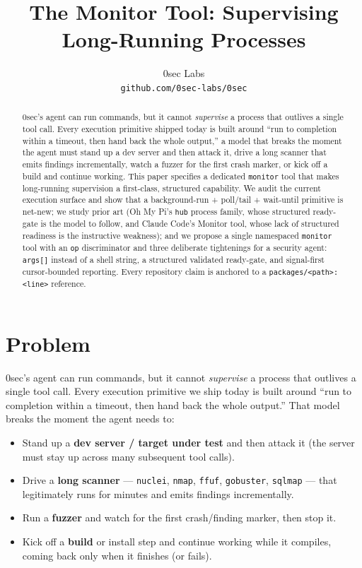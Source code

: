 \documentclass[11pt]{article}
\title{The Monitor Tool: Supervising Long-Running Processes}
\author{
  0sec Labs \\
  \texttt{github.com/0sec-labs/0sec}
}
\date{}
\begin{document}
\maketitle

\begin{abstract}
0sec's agent can run commands, but it cannot \textit{supervise} a process that
outlives a single tool call. Every execution primitive shipped today is built
around ``run to completion within a timeout, then hand back the whole output,'' a
model that breaks the moment the agent must stand up a dev server and then attack
it, drive a long scanner that emits findings incrementally, watch a fuzzer for
the first crash marker, or kick off a build and continue working. This paper
specifies a dedicated \texttt{monitor} tool that makes long-running supervision a
first-class, structured capability. We audit the current execution surface and
show that a background-run + poll/tail + wait-until primitive is net-new; we
study prior art (Oh My Pi's \texttt{hub} process family, whose structured
ready-gate is the model to follow, and Claude Code's Monitor tool, whose lack of
structured readiness is the instructive weakness); and we propose a single
namespaced \texttt{monitor} tool with an \texttt{op} discriminator and three
deliberate tightenings for a security agent: \texttt{args[]} instead of a shell
string, a structured validated ready-gate, and signal-first cursor-bounded
reporting. Every repository claim is anchored to a
\texttt{packages/<path>:<line>} reference.
\end{abstract}

\section{Problem}

0sec's agent can run commands, but it cannot \textit{supervise} a process that
outlives a single tool call. Every execution primitive we ship today is built
around ``run to completion within a timeout, then hand back the whole output.''
That model breaks the moment the agent needs to:

\begin{itemize}[leftmargin=*]
  \item Stand up a \textbf{dev server / target under test} and then attack it
  (the server must stay up across many subsequent tool calls).
  \item Drive a \textbf{long scanner} --- \texttt{nuclei}, \texttt{nmap},
  \texttt{ffuf}, \texttt{gobuster}, \texttt{sqlmap} --- that legitimately runs for
  minutes and emits findings incrementally.
  \item Run a \textbf{fuzzer} and watch for the first crash/finding marker, then
  stop it.
  \item Kick off a \textbf{build} or install step and continue working while it
  compiles, coming back only when it finishes (or fails).
\end{itemize}
\end{document}
